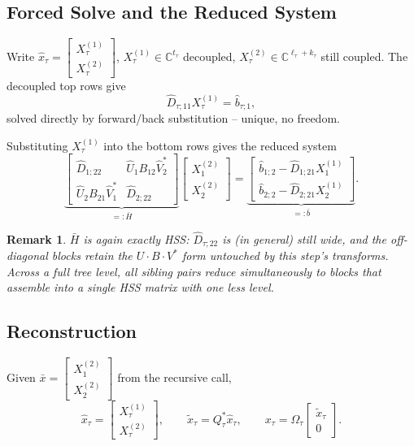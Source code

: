 \documentclass[11pt]{article}
\newtheorem{remark}{Remark}
\begin{document}
\subsection{Forced Solve and the Reduced System}
\label{subsec:forcedsolve}

Write $\hat x_\tau=\begin{bmatrix}X_\tau^{(1)}\\X_\tau^{(2)}\end{bmatrix}$,
$X_\tau^{(1)}\in\mathbb{C}^{t_\tau}$ decoupled, $X_\tau^{(2)}\in\mathbb{C}^{\ell_\tau+k_\tau}$ still coupled.
The decoupled top rows give
\[
\hat D_{\tau;11}X_\tau^{(1)} = \hat b_{\tau;1},
\]
solved directly by forward/back substitution -- unique, no freedom.

Substituting $X_\tau^{(1)}$ into the bottom rows gives the reduced system
\[
\underbrace{\begin{bmatrix}
\hat D_{1;22} & \hat U_1B_{12}\hat V_2^*\\
\hat U_2B_{21}\hat V_1^* & \hat D_{2;22}
\end{bmatrix}}_{=:\bar H}
\begin{bmatrix}X_1^{(2)}\\X_2^{(2)}\end{bmatrix}
=
\underbrace{\begin{bmatrix}\hat b_{1;2}-\hat D_{1;21}X_1^{(1)}\\ \hat b_{2;2}-\hat D_{2;21}X_2^{(1)}\end{bmatrix}}_{=:\bar b}.
\]

\begin{remark}
$\bar H$ is again exactly HSS: $\hat D_{\tau;22}$ is (in general) still wide,
and the off-diagonal blocks retain the $U\cdot B\cdot V^*$ form untouched by
this step's transforms. Across a full tree level, all sibling pairs reduce
simultaneously to blocks that assemble into a single HSS matrix with one less
level.
\end{remark}

\subsection{Reconstruction}
\label{subsec:reconstruction}

Given $\bar x=\begin{bmatrix}X_1^{(2)}\\X_2^{(2)}\end{bmatrix}$ from the
recursive call,
\[
\hat x_\tau = \begin{bmatrix}X_\tau^{(1)}\\X_\tau^{(2)}\end{bmatrix},\qquad
\tilde x_\tau = Q_\tau^*\hat x_\tau,\qquad
x_\tau = \Omega_\tau\begin{bmatrix}\tilde x_\tau\\0\end{bmatrix}.
\]
\end{document}
